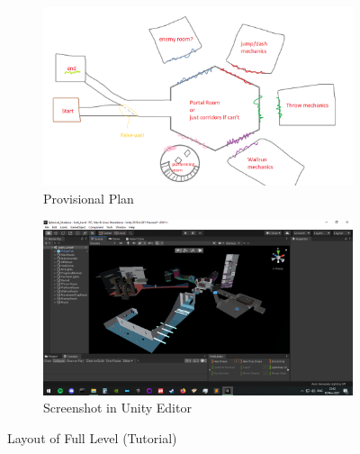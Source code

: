 \begin{figure}[H]
\centering
\begin{subfigure}{0.5\textwidth}
  \centering
  \includegraphics[width=1\linewidth]{Figures/fullplan.png}
  \caption{Provisional Plan}
\end{subfigure}%
\begin{subfigure}{0.5\textwidth}
  \centering
  \includegraphics[width=1\linewidth]{Figures/full.png}
  \caption{Screenshot in Unity Editor}
\end{subfigure}
\caption{Layout of Full Level (Tutorial)}
\end{figure}


